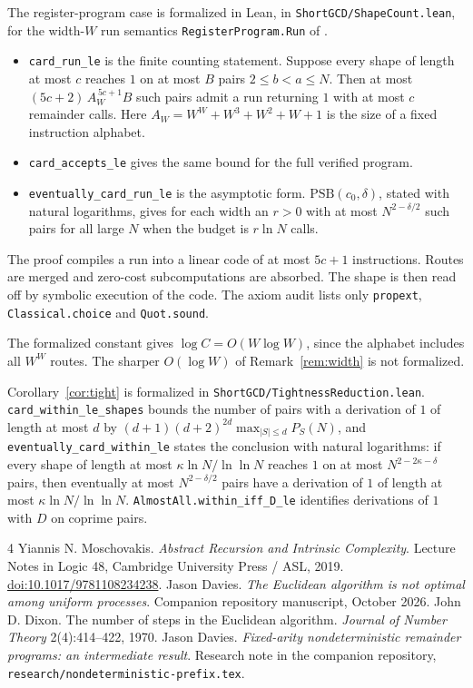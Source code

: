 \documentclass[11pt]{article}
\theoremstyle{remark}
\begin{document}
The register-program case is formalized in Lean, in
\texttt{ShortGCD/ShapeCount.lean}, for the width-$W$ run semantics
\texttt{RegisterProgram.Run} of \cite{fixedwidth}.
\begin{itemize}
\item \texttt{card\_run\_le} is the finite counting statement. Suppose every
shape of length at most $c$ reaches $1$ on at most $B$ pairs
$2\le b<a\le N$. Then at most $(5c+2)\,A_W^{\,5c+1}B$ such pairs admit a run
returning $1$ with at most $c$ remainder calls. Here $A_W=W^W+W^3+W^2+W+1$ is
the size of a fixed instruction alphabet.
\item \texttt{card\_accepts\_le} gives the same bound for the full verified
program.
\item \texttt{eventually\_card\_run\_le} is the asymptotic form.
$\mathrm{PSB}(c_0,\delta)$, stated with natural logarithms, gives for each
width an $r>0$ with at most $N^{2-\delta/2}$ such pairs for all large $N$ when
the budget is $r\ln N$ calls.
\end{itemize}
The proof compiles a run into a linear code of at most $5c+1$ instructions.
Routes are merged and zero-cost subcomputations are absorbed. The shape is then
read off by symbolic execution of the code. The axiom audit lists only
\texttt{propext}, \texttt{Classical.choice} and \texttt{Quot.sound}.

The formalized constant gives $\log C=O(W\log W)$, since the alphabet includes
all $W^W$ routes. The sharper $O(\log W)$ of Remark~\ref{rem:width} is not
formalized.

Corollary~\ref{cor:tight} is formalized in
\texttt{ShortGCD/TightnessReduction.lean}. \texttt{card\_within\_le\_shapes}
bounds the number of pairs with a derivation of $1$ of length at most $d$ by
$(d+1)(d+2)^{2d}\max_{|S|\leq d}P_S(N)$, and
\texttt{eventually\_card\_within\_le} states the conclusion with natural
logarithms: if every shape of length at most $\kappa\ln N/\ln\ln N$ reaches
$1$ on at most $N^{2-2\kappa-\delta}$ pairs, then eventually at most
$N^{2-\delta/2}$ pairs have a derivation of $1$ of length at most
$\kappa\ln N/\ln\ln N$.
\texttt{AlmostAll.within\_iff\_D\_le} identifies derivations of $1$ with
$D$ on coprime pairs.

\begin{thebibliography}{4}
Yiannis N. Moschovakis.
\emph{Abstract Recursion and Intrinsic Complexity}.
Lecture Notes in Logic 48, Cambridge University Press / ASL, 2019.
\href{https://doi.org/10.1017/9781108234238}{doi:10.1017/9781108234238}.
Jason Davies.
\emph{The Euclidean algorithm is not optimal among uniform processes}.
Companion repository manuscript, October 2026.
John D. Dixon.
The number of steps in the Euclidean algorithm.
\emph{Journal of Number Theory} 2(4):414--422, 1970.
Jason Davies.
\emph{Fixed-arity nondeterministic remainder programs: an intermediate result}.
Research note in the companion repository, \texttt{research/nondeterministic-prefix.tex}.
\end{thebibliography}
\end{document}
